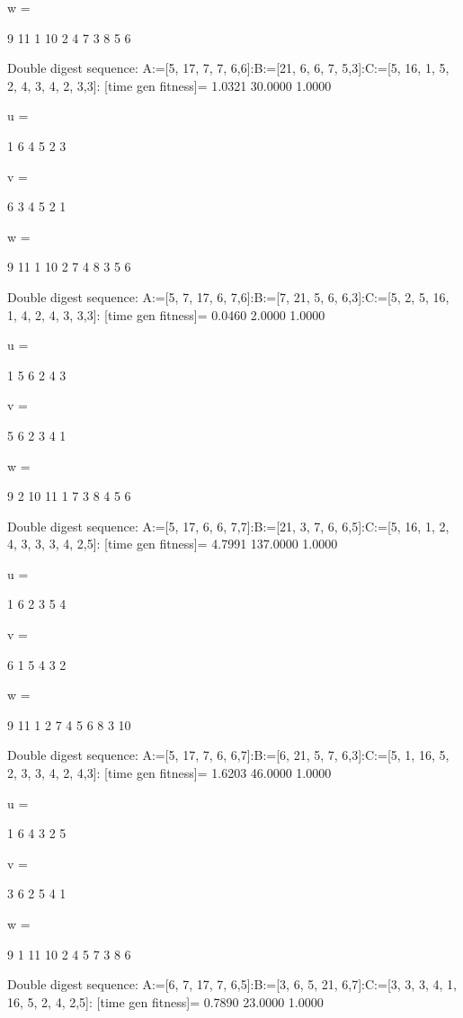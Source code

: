 w =

     9    11     1    10     2     4     7     3     8     5     6

Double digest sequence:
A:=[5, 17, 7, 7, 6,6]:B:=[21, 6, 6, 7, 5,3]:C:=[5, 16, 1, 5, 2, 4, 3, 4, 2, 3,3]:
[time gen fitness]=
    1.0321   30.0000    1.0000


u =

     1     6     4     5     2     3


v =

     6     3     4     5     2     1


w =

     9    11     1    10     2     7     4     8     3     5     6

Double digest sequence:
A:=[5, 7, 17, 6, 7,6]:B:=[7, 21, 5, 6, 6,3]:C:=[5, 2, 5, 16, 1, 4, 2, 4, 3, 3,3]:
[time gen fitness]=
    0.0460    2.0000    1.0000


u =

     1     5     6     2     4     3


v =

     5     6     2     3     4     1


w =

     9     2    10    11     1     7     3     8     4     5     6

Double digest sequence:
A:=[5, 17, 6, 6, 7,7]:B:=[21, 3, 7, 6, 6,5]:C:=[5, 16, 1, 2, 4, 3, 3, 3, 4, 2,5]:
[time gen fitness]=
    4.7991  137.0000    1.0000


u =

     1     6     2     3     5     4


v =

     6     1     5     4     3     2


w =

     9    11     1     2     7     4     5     6     8     3    10

Double digest sequence:
A:=[5, 17, 7, 6, 6,7]:B:=[6, 21, 5, 7, 6,3]:C:=[5, 1, 16, 5, 2, 3, 3, 4, 2, 4,3]:
[time gen fitness]=
    1.6203   46.0000    1.0000


u =

     1     6     4     3     2     5


v =

     3     6     2     5     4     1


w =

     9     1    11    10     2     4     5     7     3     8     6

Double digest sequence:
A:=[6, 7, 17, 7, 6,5]:B:=[3, 6, 5, 21, 6,7]:C:=[3, 3, 3, 4, 1, 16, 5, 2, 4, 2,5]:
[time gen fitness]=
    0.7890   23.0000    1.0000


